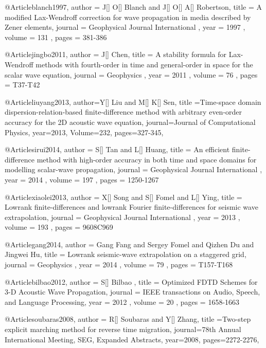 @Article{blanch1997,
 author =  { J[] O[] Blanch and J[] O[] A[] Robertson},
 title =   {A modified Lax-Wendroff correction for wave propagation in media described by Zener elements},
 journal = { Geophysical Journal International },
 year =    { 1997 },
 volume =  { 131 },
 pages =   { 381-386 }
}

@Article{jingbo2011,
 author =  { J[] Chen},
 title =   {A stability formula for Lax-Wendroff methods with fourth-order in time and general-order in space for the scalar wave equation},
 journal = { Geophysics },
 year =    { 2011 },
 volume =  { 76 },
 pages =   { T37-T42 }
}

@Article{liuyang2013,
  author={Y[] Liu and M[] K[] Sen},
  title ={Time-space domain dispersion-relation-based finite-difference method with arbitrary even-order accuracy for the 2{D} acoustic wave equation},
  journal={Journal of Computational Physics},
  year=2013,
  Volume=232,
  pages={327-345},
}






@Article{sirui2014,
 author =  { S[] Tan and L[] Huang},
 title =   {An efficient finite-difference method with high-order accuracy in both time and space domains for modelling scalar-wave propagation},
 journal = { Geophysical Journal International },
 year =    { 2014 },
 volume =  { 197 },
 pages =   { 1250-1267 }
}

@Article{xiaolei2013,
 author =  { X[] Song and S[] Fomel and L[] Ying},
 title =   {Lowrank finite-differences and lowrank {F}ourier finite-differences for seismic wave extrapolation},
 journal = { Geophysical Journal International },
 year =    { 2013 },
 volume =  { 193 },
 pages =   { 960\A8C969 }
}

@Article{gang2014,
 author =  { Gang Fang and Sergey Fomel and Qizhen Du and Jingwei Hu},
 title =   {Lowrank seismic-wave extrapolation on a staggered grid},
 journal = { Geophysics },
 year =    { 2014 },
 volume =  { 79 },
 pages =   { T157-T168}
}


@Article{bilbao2012,
 author =  { S[] Bilbao },
 title =   {Optimized FDTD Schemes for 3-D Acoustic Wave Propagation},
 journal = { IEEE transactions on Audio, Speech, and Language Processing},
 year =    { 2012 },
 volume =  { 20 },
 pages =   { 1658-1663}
}

@Article{soubaras2008,
  author = {R[] Soubaras and Y[] Zhang},
  title ={Two-step explicit marching method for reverse time migration},
  journal={78th Annual International Meeting, SEG, Expanded Abstracts},
  year=2008,
  pages={2272-2276},
}

